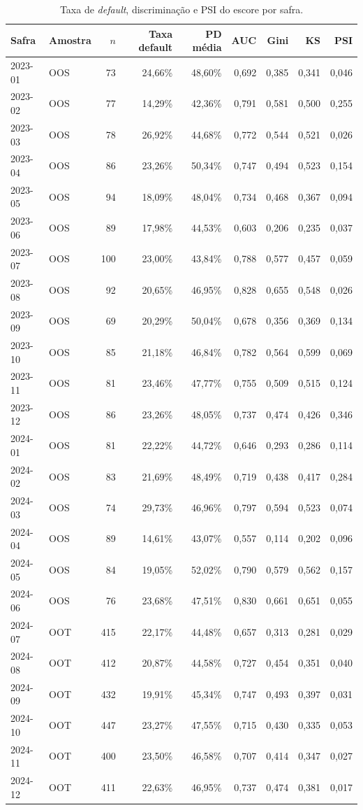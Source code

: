 \documentclass[11pt,a4paper]{article}
\begin{document}
\begin{table}[H]
\centering\footnotesize
\caption{Taxa de \emph{default}, discriminação e PSI do escore por safra.}
\label{tab:safra}
\begin{tabular}{llrrrrrrr}
\toprule
Safra & Amostra & $n$ & Taxa default & PD média & AUC & Gini & KS & PSI \\
\midrule
2023-01 & OOS & 73 & 24,66\% & 48,60\% & 0,692 & 0,385 & 0,341 & 0,046 \\
2023-02 & OOS & 77 & 14,29\% & 42,36\% & 0,791 & 0,581 & 0,500 & 0,255 \\
2023-03 & OOS & 78 & 26,92\% & 44,68\% & 0,772 & 0,544 & 0,521 & 0,026 \\
2023-04 & OOS & 86 & 23,26\% & 50,34\% & 0,747 & 0,494 & 0,523 & 0,154 \\
2023-05 & OOS & 94 & 18,09\% & 48,04\% & 0,734 & 0,468 & 0,367 & 0,094 \\
2023-06 & OOS & 89 & 17,98\% & 44,53\% & 0,603 & 0,206 & 0,235 & 0,037 \\
2023-07 & OOS & 100 & 23,00\% & 43,84\% & 0,788 & 0,577 & 0,457 & 0,059 \\
2023-08 & OOS & 92 & 20,65\% & 46,95\% & 0,828 & 0,655 & 0,548 & 0,026 \\
2023-09 & OOS & 69 & 20,29\% & 50,04\% & 0,678 & 0,356 & 0,369 & 0,134 \\
2023-10 & OOS & 85 & 21,18\% & 46,84\% & 0,782 & 0,564 & 0,599 & 0,069 \\
2023-11 & OOS & 81 & 23,46\% & 47,77\% & 0,755 & 0,509 & 0,515 & 0,124 \\
2023-12 & OOS & 86 & 23,26\% & 48,05\% & 0,737 & 0,474 & 0,426 & 0,346 \\
2024-01 & OOS & 81 & 22,22\% & 44,72\% & 0,646 & 0,293 & 0,286 & 0,114 \\
2024-02 & OOS & 83 & 21,69\% & 48,49\% & 0,719 & 0,438 & 0,417 & 0,284 \\
2024-03 & OOS & 74 & 29,73\% & 46,96\% & 0,797 & 0,594 & 0,523 & 0,074 \\
2024-04 & OOS & 89 & 14,61\% & 43,07\% & 0,557 & 0,114 & 0,202 & 0,096 \\
2024-05 & OOS & 84 & 19,05\% & 52,02\% & 0,790 & 0,579 & 0,562 & 0,157 \\
2024-06 & OOS & 76 & 23,68\% & 47,51\% & 0,830 & 0,661 & 0,651 & 0,055 \\
\midrule
2024-07 & OOT & 415 & 22,17\% & 44,48\% & 0,657 & 0,313 & 0,281 & 0,029 \\
2024-08 & OOT & 412 & 20,87\% & 44,58\% & 0,727 & 0,454 & 0,351 & 0,040 \\
2024-09 & OOT & 432 & 19,91\% & 45,34\% & 0,747 & 0,493 & 0,397 & 0,031 \\
2024-10 & OOT & 447 & 23,27\% & 47,55\% & 0,715 & 0,430 & 0,335 & 0,053 \\
2024-11 & OOT & 400 & 23,50\% & 46,58\% & 0,707 & 0,414 & 0,347 & 0,027 \\
2024-12 & OOT & 411 & 22,63\% & 46,95\% & 0,737 & 0,474 & 0,381 & 0,017 \\
\bottomrule
\end{tabular}
\end{table}
\end{document}

